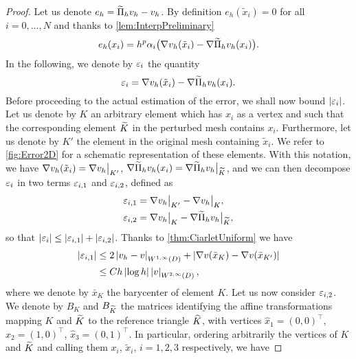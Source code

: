 \documentclass[10pt]{article}
\begin{document}
\begin{lemma}\label{lem:Interp2D} 
\end{lemma}
\begin{proof} Let us denote $e_h = \widetilde \Pi_h v_h - v_h$. By definition $e_h(\tilde x_i) = 0$ for all $i = 0, \ldots, N$ and thanks to \cref{lem:InterpPreliminary}
	\begin{equation}\label{eq:ValueNodes}
		e_h(x_i) = h^p \alpha_i \big(\nabla v_h(\tilde x_i) - \nabla \widetilde \Pi_hv_h(x_i)\big).
	\end{equation}
	In the following, we denote by $\varepsilon_i$ the quantity
	\begin{equation}
		\varepsilon_i = \nabla v_h(\tilde x_i) - \nabla \widetilde \Pi_h v_h(x_i).
	\end{equation}
	Before proceeding to the actual estimation of the error, we shall now bound $\left\lvert\varepsilon_i\right\rvert$. Let us denote by $K$ an arbitrary element which has $x_i$ as a vertex and such that the corresponding element $\widetilde K$ in the perturbed mesh contains $x_i$. Furthermore, let us denote by $K'$ the element in the original mesh containing $\tilde x_i$. We refer to \cref{fig:Error2D} for a schematic representation of these elements. With this notation, we have $\nabla v_h(\tilde x_i) = \nabla v_h\bigr\rvert_{K'}$, $\nabla \widetilde \Pi_hv_h(x_i) = \nabla \widetilde \Pi_h v_h\bigr\rvert_{\widetilde K}$, and we can then decompose $\varepsilon_i$ in two terms $\varepsilon_{i, 1}$ and $\varepsilon_{i, 2}$, defined as
	\begin{equation}
	\begin{aligned}
		\varepsilon_{i, 1} &= \nabla v_h\bigr\rvert_{K'} - \nabla v_h\bigr\rvert_{K}, \\
		\varepsilon_{i, 2} &= \nabla v_h\bigr\rvert_{K}  - \nabla \widetilde \Pi_h v_h \bigr\rvert_{\widetilde K},
	\end{aligned}	
	\end{equation}
	so that $\left\lvert\varepsilon_i\right\rvert \leq \left\lvert\varepsilon_{i, 1}\right\rvert + \left\lvert\varepsilon_{i, 2}\right\rvert$. Thanks to \cref{thm:CiarletUniform} we have
	\begin{equation}\label{eq:gradDiffSmooth2d}
	\begin{aligned}
	\left\lvert\varepsilon_{i, 1}\right\rvert &\leq 2 \left\lvert v_h - v\right\rvert_{W^{1,\infty}(D)} + \left\lvert\nabla v(\bar x_K) - \nabla v(\bar x_{K'})\right\rvert\\
	&\leq C h \left\lvert\log h\right\rvert \left\lvert v\right\rvert_{W^{2, \infty}(D)},
	\end{aligned}
	\end{equation}
	where we denote by $\bar x_K$ the barycenter of element $K$. Let us now consider $\varepsilon_{i, 2}$. We denote by $B_K$ and $B_{\widetilde K}$ the matrices identifying the affine transformations mapping $K$ and $\widetilde K$ to the reference triangle $\widehat K$, with vertices $\hat x_1 = (0, 0)^\top$, $\hat x_2 = (1, 0)^\top$, $\hat x_3 = (0, 1)^\top$. In particular, ordering arbitrarily the vertices of $K$ and $\widetilde K$ and calling them $x_i$, $\tilde x_i$, $i = 1, 2, 3$ respectively, we have

\end{proof}
\end{document}
